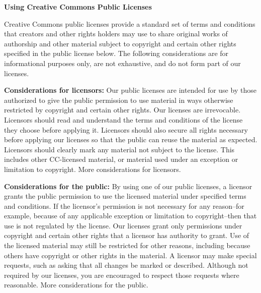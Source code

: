 \par \textbf{Using Creative Commons Public Licenses}
\par Creative Commons public licenses provide a standard set of terms and conditions that creators and other rights holders may use to share original works of authorship and other material subject to copyright and certain other rights specified in the public license below. The following considerations are for informational purposes only, are not exhaustive, and do not form part of our licenses.
\par \textbf{Considerations for licensors:} Our public licenses are intended for use by those authorized to give the public permission to use material in ways otherwise restricted by copyright and certain other rights. Our licenses are irrevocable. Licensors should read and understand the terms and conditions of the license they choose before applying it. Licensors should also secure all rights necessary before applying our licenses so that the public can reuse the material as expected. Licensors should clearly mark any material not subject to the license. This includes other CC-licensed material, or material used under an exception or limitation to copyright. More considerations for licensors.
\par \textbf{Considerations for the public:} By using one of our public licenses, a licensor grants the public permission to use the licensed material under specified terms and conditions. If the licensor’s permission is not necessary for any reason–for example, because of any applicable exception or limitation to copyright–then that use is not regulated by the license. Our licenses grant only permissions under copyright and certain other rights that a licensor has authority to grant. Use of the licensed material may still be restricted for other reasons, including because others have copyright or other rights in the material. A licensor may make special requests, such as asking that all changes be marked or described. Although not required by our licenses, you are encouraged to respect those requests where reasonable.
More considerations for the public.

